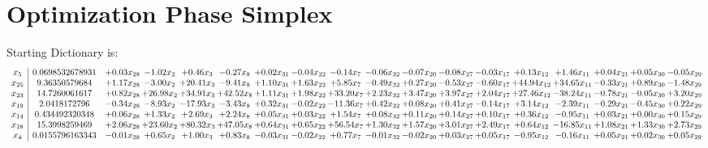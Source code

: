 \documentclass[9pt]{article}
\begin{document}
\section{Optimization Phase Simplex}
Starting Dictionary is:
\[\begin{array}{c| c c@{\hskip 2pt} c@{\hskip 2pt} c@{\hskip 2pt} c@{\hskip 2pt} c@{\hskip 2pt} c@{\hskip 2pt} c@{\hskip 2pt} c@{\hskip 2pt} c@{\hskip 2pt} c@{\hskip 2pt} c@{\hskip 2pt} c@{\hskip 2pt} c@{\hskip 2pt} c@{\hskip 2pt} c@{\hskip 2pt} c@{\hskip 2pt} }
 x_{5}   &  0.0698532678931 & +  0.03 x_{28} & -1.02 x_{2} & +  0.46 x_{3} & -0.27 x_{8} & +  0.02 x_{31} & -0.04 x_{22} & -0.14 x_{7} & -0.06 x_{32} & -0.07 x_{20} & -0.08 x_{27} & -0.03 x_{17} & +  0.13 x_{12} & +  1.46 x_{11} & +  0.04 x_{21} & +  0.05 x_{30} & -0.05 x_{29}\\
 x_{25}   &  9.36350579684 & +  1.17 x_{28} & -3.00 x_{2} & + 20.41 x_{3} & -9.41 x_{8} & +  1.10 x_{31} & +  1.63 x_{22} & +  5.85 x_{7} & -0.49 x_{32} & +  0.27 x_{20} & -0.53 x_{27} & -0.60 x_{17} & + 44.94 x_{12} & + 34.65 x_{11} & -0.33 x_{21} & +  0.89 x_{30} & -1.48 x_{29}\\
 x_{23}   &  14.7260061617 & +  0.82 x_{28} & + 26.98 x_{2} & + 34.91 x_{3} & + 42.52 x_{8} & +  1.11 x_{31} & +  1.98 x_{22} & + 33.20 x_{7} & +  2.23 x_{32} & +  3.47 x_{20} & +  3.97 x_{27} & +  2.04 x_{17} & + 27.46 x_{12} & -38.24 x_{11} & -0.78 x_{21} & -0.05 x_{30} & +  3.20 x_{29}\\
 x_{19}   &  2.0418172796 & -0.34 x_{28} & -8.93 x_{2} & -17.93 x_{3} & -3.43 x_{8} & +  0.32 x_{31} & -0.02 x_{22} & -11.36 x_{7} & +  0.42 x_{32} & +  0.08 x_{20} & +  0.41 x_{27} & -0.14 x_{17} & +  3.14 x_{12} & -2.39 x_{11} & -0.29 x_{21} & -0.45 x_{30} & +  0.22 x_{29}\\
 x_{14}   &  0.434492320348 & +  0.06 x_{28} & +  1.33 x_{2} & +  2.69 x_{3} & +  2.24 x_{8} & +  0.05 x_{31} & +  0.03 x_{22} & +  1.54 x_{7} & +  0.08 x_{32} & +  0.11 x_{20} & +  0.14 x_{27} & +  0.10 x_{17} & +  0.36 x_{12} & -0.95 x_{11} & +  0.03 x_{21} & +  0.00 x_{30} & +  0.15 x_{29}\\
 x_{18}   &  15.3998259469 & +  2.06 x_{28} & + 23.60 x_{2} & + 80.32 x_{3} & + 47.05 x_{8} & +  0.64 x_{31} & +  0.65 x_{22} & + 56.54 x_{7} & +  1.30 x_{32} & +  1.57 x_{20} & +  3.01 x_{27} & +  2.49 x_{17} & +  0.64 x_{12} & -16.85 x_{11} & +  1.08 x_{21} & +  1.33 x_{30} & +  2.73 x_{29}\\
 x_{4}   &  0.0155796163343 & -0.01 x_{28} & +  0.65 x_{2} & +  1.00 x_{3} & +  0.83 x_{8} & -0.03 x_{31} & -0.02 x_{22} & +  0.77 x_{7} & -0.01 x_{32} & -0.02 x_{20} & +  0.03 x_{27} & +  0.05 x_{17} & -0.95 x_{12} & -0.16 x_{11} & +  0.05 x_{21} & +  0.02 x_{30} & +  0.05 x_{29}\\

\end{array}\]
\end{document}
